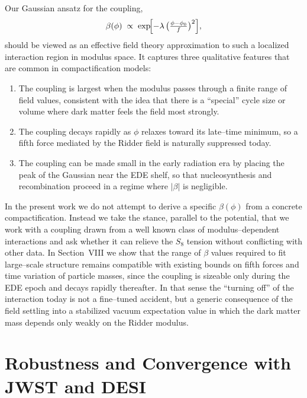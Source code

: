 \documentclass[a4paper,11pt]{article}
\begin{document}
Our Gaussian ansatz for the coupling,
\begin{equation}
\beta(\phi) \;\propto\; \exp\!\Bigl[-\lambda\,\bigl(\tfrac{\phi-\phi_0}{f}\bigr)^2\Bigr],
\end{equation}
should be viewed as an effective field theory approximation to such a localized interaction region in modulus space. It captures three qualitative features that are common in compactification models:
\begin{enumerate}
    \item The coupling is largest when the modulus passes through a finite range of field values, consistent with the idea that there is a ``special'' cycle size or volume where dark matter feels the field most strongly.
    \item The coupling decays rapidly as $\phi$ relaxes toward its late--time minimum, so a fifth force mediated by the Ridder field is naturally suppressed today.
    \item The coupling can be made small in the early radiation era by placing the peak of the Gaussian near the EDE shelf, so that nucleosynthesis and recombination proceed in a regime where $|\beta|$ is negligible.
\end{enumerate}

In the present work we do not attempt to derive a specific $\beta(\phi)$ from a concrete compactification. Instead we take the stance, parallel to the potential, that we work with a coupling drawn from a well known class of modulus--dependent interactions and ask whether it can relieve the $S_8$ tension without conflicting with other data. In Section~VIII we show that the range of $\beta$ values required to fit large--scale structure remains compatible with existing bounds on fifth forces and time variation of particle masses, since the coupling is sizeable only during the EDE epoch and decays rapidly thereafter. In that sense the ``turning off'' of the interaction today is not a fine--tuned accident, but a generic consequence of the field settling into a stabilized vacuum expectation value in which the dark matter mass depends only weakly on the Ridder modulus.


\section{Robustness and Convergence with JWST and DESI}
\end{document}
